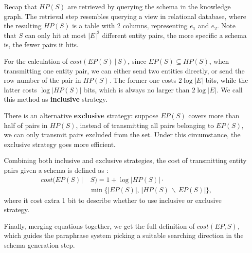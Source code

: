 Recap that $HP(S)$ are retrieved by querying the schema in the knowledge graph.
The retrieval step resembles querying a view in relational database,
where the resulting $HP(S)$ is a table with 2 columns, representing $e_1$ and $e_2$.
Note that $S$ can only hit at most $|E|^2$ different entity pairs, the more specific
a schema is, the fewer pairs it hits.

For the calculation of $cost(EP(S)\, |\, S)$,
since $EP(S) \subseteq HP(S)$, when transmitting one entity pair,
we can either send two entities directly, or send the row number of the pair in $HP(S)$.
The former one costs $2\log|E|$ bits, while the latter costs $\log{|HP(S)|}$ bits,
which is always no larger than $2\log|E|$.
We call this method as \textbf{inclusive} strategy.

There is an alternative \textbf{exclusive} strategy: suppose $EP(S)$ covers more than
half of pairs in $HP(S)$, instead of transmitting all pairs belonging to $EP(S)$,
we can only transmit pairs excluded from the set. Under this circumstance, the exclusive
strategy goes more efficient.

Combining both inclusive and exclusive strategies, the cost of transmitting entity pairs
given a schema is defined as :
\begin{equation}
\label{eqn:costd}
\begin{aligned}
cost(EP(S)\, |&\, S) = 1 + \log|HP(S)| \cdot   \\
    &\min\{|EP(S)|,\, |HP(S)\, \backslash\, EP(S)|\},
\end{aligned}
\end{equation}
\noindent
where it cost extra 1 bit to describe whether to use inclusive or exclusive strategy.

Finally, merging equations together, we get the full definition of $cost(EP, S)$,
which guides the paraphrase system picking a suitable searching direction
in the schema generation step.

